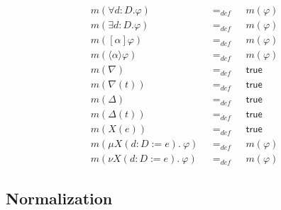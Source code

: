 \documentclass{article}
\begin{document}
\begin{equation*}
\begin{array}{lll}
m(\forall d{{:}D}.\varphi ) & =_{def} & m(\varphi ) \\
m(\exists d{{:}D}.\varphi ) & =_{def} & m(\varphi ) \\
m([\alpha ]\varphi ) & =_{def} & m(\varphi ) \\
m(\langle \alpha \rangle \varphi ) & =_{def} & m(\varphi ) \\
m(\nabla ) & =_{def} & \mathsf{true} \\
m(\nabla (t)) & =_{def} & \mathsf{true} \\
m(\Delta ) & =_{def} & \mathsf{true} \\
m(\Delta (t)) & =_{def} & \mathsf{true} \\
m(X(e)) & =_{def} & \mathsf{true} \\
m(\mu X(d{:}D:=e).~\varphi )~~~ & =_{def}~~~ & m(\varphi ) \\
m(\nu X(d{:}D:=e).~\varphi )~~~ & =_{def}~~~ & m(\varphi )%
\end{array}%
\end{equation*}

\newpage

\subsection{Normalization}
\end{document}
